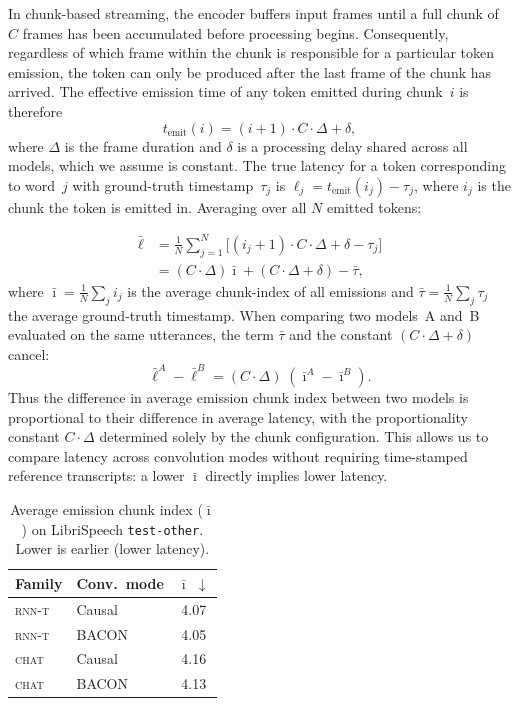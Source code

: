 \documentclass[cameraready]{Interspeech}
\begin{document}
In chunk-based streaming, the encoder buffers input frames until a full chunk
of $C$ frames has been accumulated before processing begins. Consequently,
regardless of which frame within the chunk is responsible for a particular
token emission, the token can only be produced after the last frame of the
chunk has arrived. The effective emission time of any token emitted during
chunk~$i$ is therefore
\begin{equation}
    t_{\text{emit}}(i) = (i+1) \cdot C \cdot \Delta + \delta,
    \label{eq:emit-time}
\end{equation}
where $\Delta$ is the frame duration and $\delta$ is a processing
delay shared across all models, which we assume is constant. The true latency for a token corresponding to word~$j$ with
ground-truth timestamp~$\tau_j$ is
$\ell_j = t_{\text{emit}}(i_j) - \tau_j$,
where $i_j$ is the chunk the token is emitted in. Averaging over all
$N$ emitted tokens:

\begin{equation}
    \begin{aligned}
        \bar{\ell} &= \frac{1}{N}\sum_{j=1}^{N} \bigl[(i_j+1)\cdot C\cdot\Delta + \delta - \tau_j\bigr] \\
                   &= (C\cdot\Delta) \bar{\imath} + (C\cdot\Delta + \delta) - \bar{\tau},
    \end{aligned}
    \label{eq:avg-latency}
\end{equation}
where $\bar{\imath} = \frac{1}{N}\sum_j i_j$ is the average chunk-index of all
emissions and $\bar{\tau} = \frac{1}{N}\sum_j \tau_j$ the average
ground-truth timestamp. When comparing two models~A and~B evaluated on the
same utterances, the term $\bar{\tau}$ and the constant
$(C\cdot\Delta + \delta)$ cancel:
\begin{equation}
    \bar{\ell}^{A} - \bar{\ell}^{B} = (C\cdot\Delta)\;(\bar{\imath}^{A} - \bar{\imath}^{B}).
    \label{eq:latency-diff}
\end{equation}
Thus the difference in average emission chunk index between two models is
proportional to their difference in average latency, with the proportionality
constant $C\cdot\Delta$ determined solely by the chunk configuration. This
allows us to compare latency across convolution modes without requiring
time-stamped reference transcripts: a lower $\bar{\imath}$ directly implies lower
latency.

\begin{table}[h]
\centering
\caption{Average emission chunk index ($\bar{\imath}$) on LibriSpeech
\texttt{test-other}. Lower is earlier (lower latency).}
\label{tab:latency}
\begin{tabular}{llc}
\toprule
\textbf{Family} & \textbf{Conv.\ mode} & $\bar{\imath}$ $\downarrow$ \\
\midrule
\textsc{rnn-t} & Causal & 4.07 \\
\textsc{rnn-t} & BACON  & 4.05 \\
\midrule
\textsc{chat} & Causal & 4.16 \\
\textsc{chat} & BACON  & 4.13 \\
\bottomrule
\end{tabular}
\end{table}
\end{document}
